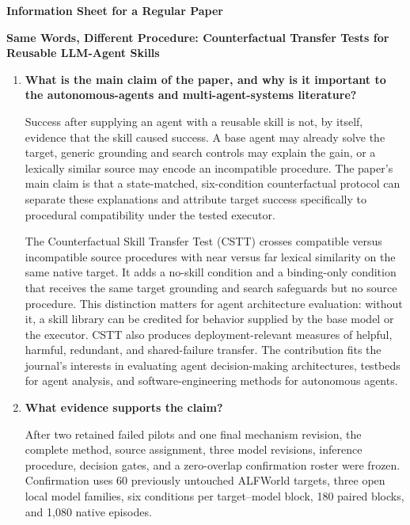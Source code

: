 \documentclass[10pt]{article}
\begin{document}
\begin{center}
{\Large\bfseries Information Sheet for a Regular Paper}\par
\vspace{4pt}
{\bfseries Same Words, Different Procedure: Counterfactual Transfer Tests for
Reusable LLM-Agent Skills}
\end{center}

\begin{enumerate}
\item \textbf{What is the main claim of the paper, and why is it important to
the autonomous-agents and multi-agent-systems literature?}

Success after supplying an agent with a reusable skill is not, by itself,
evidence that the skill caused success. A base agent may already solve the
target, generic grounding and search controls may explain the gain, or a
lexically similar source may encode an incompatible procedure. The paper's
main claim is that a state-matched, six-condition counterfactual protocol can
separate these explanations and attribute target success specifically to
procedural compatibility under the tested executor.

The Counterfactual Skill Transfer Test (CSTT) crosses compatible versus
incompatible source procedures with near versus far lexical similarity on the
same native target. It adds a no-skill condition and a binding-only condition
that receives the same target grounding and search safeguards but no source
procedure. This distinction matters for agent architecture evaluation: without
it, a skill library can be credited for behavior supplied by the base model or
the executor. CSTT also produces deployment-relevant measures of helpful,
harmful, redundant, and shared-failure transfer. The contribution fits the
journal's interests in evaluating agent decision-making architectures,
testbeds for agent analysis, and software-engineering methods for autonomous
agents.

\item \textbf{What evidence supports the claim?}

After two retained failed pilots and one final mechanism revision, the complete
method, source assignment, three model revisions, inference procedure, decision
gates, and a zero-overlap confirmation roster were frozen. Confirmation uses 60
previously untouched ALFWorld targets, three open local model families, six
conditions per target--model block, 180 paired blocks, and 1,080 native
episodes.


\end{enumerate}
\end{document}

